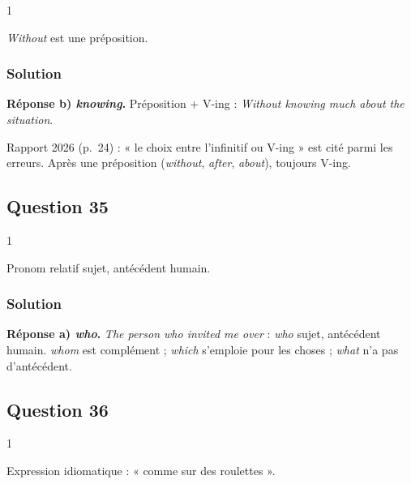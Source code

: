 \documentclass[11pt,a4paper]{article}
\begin{document}
\begin{indication}{1}

\emph{Without} est une préposition.

\end{indication}

\hypertarget{solution-33}{%
\subsubsection{Solution}\label{solution-33}}

\textbf{Réponse b) \emph{knowing}.} Préposition + V-ing : \emph{Without knowing much about the situation}.

\begin{jury}

Rapport 2026 (p.~24) : « le choix entre l'infinitif ou V-ing » est cité parmi les erreurs. Après une préposition (\emph{without}, \emph{after}, \emph{about}), toujours V-ing.

\end{jury}

\hypertarget{question-35}{%
\subsection{Question 35}\label{question-35}}

\begin{indication}{1}

Pronom relatif sujet, antécédent humain.

\end{indication}

\hypertarget{solution-34}{%
\subsubsection{Solution}\label{solution-34}}

\textbf{Réponse a) \emph{who}.} \emph{The person who invited me over} : \emph{who} sujet, antécédent humain. \emph{whom} est complément ; \emph{which} s'emploie pour les choses ; \emph{what} n'a pas d'antécédent.

\hypertarget{question-36}{%
\subsection{Question 36}\label{question-36}}

\begin{indication}{1}

Expression idiomatique : « comme sur des roulettes ».

\end{indication}
\end{document}

